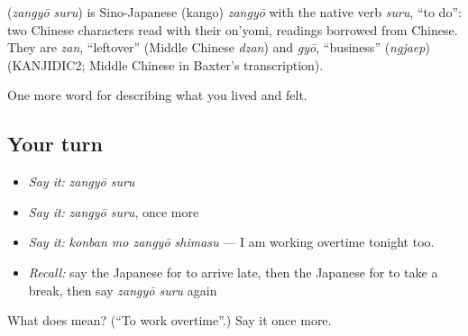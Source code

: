 \begin{cousinweb}
\textbf{} (\emph{zangyō suru}) is Sino-Japanese (kango) \emph{zangyō} with the native verb \emph{suru}, \textquotedblleft{}to do\textquotedblright{}: two Chinese characters read with their on'yomi, readings borrowed from Chinese. They are \emph{zan}, \textquotedblleft{}leftover\textquotedblright{} (Middle Chinese \emph{dzan}) and \emph{gyō}, \textquotedblleft{}business\textquotedblright{} (\emph{ngjaep}) (KANJIDIC2; Middle Chinese in Baxter's transcription).
\end{cousinweb}

\begin{grammarlens}[title={What you've built}]
One more word for describing what you lived and felt.
\end{grammarlens}

\subsection*{Your turn}
\begin{itemize}
\raggedright
  \item \emph{Say it:} \emph{zangyō suru}
  \item \emph{Say it:} \emph{zangyō suru}, once more
  \item \emph{Say it:} \emph{konban mo zangyō shimasu} — I am working overtime tonight too.
  \item \emph{Recall:} say the Japanese for to arrive late, then the Japanese for to take a break, then say \emph{zangyō suru} again
\end{itemize}

\begin{tcolorbox}[breakable,colback=teal!4,colframe=teal!35!black,title={Before you move on}]
What does  mean? (\textquotedblleft{}To work overtime\textquotedblright{}.) Say it once more.
\end{tcolorbox}
